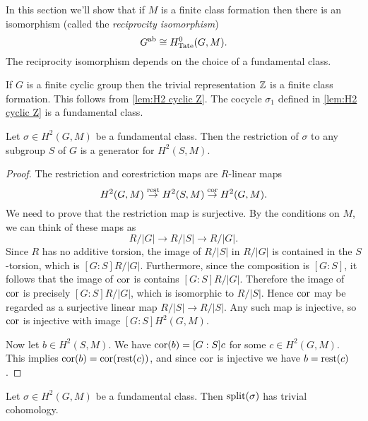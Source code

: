 In this section we'll show that if $M$ is a finite class formation then
there is an isomorphism (called the \emph{reciprocity isomorphism})
\[
	G^{\mathrm{ab}} \cong H^0_{\mathrm{Tate}}(G,M).
\]
The reciprocity isomorphism depends on the choice of a fundamental class.

\begin{example}
	If $G$ is a finite cyclic group then the trivial representation ${\mathbb Z}$
	is a finite class formation.
	This follows from \ref{lem:H2 cyclic Z}.
	The cocycle $\sigma_1$ defined in \ref{lem:H2 cyclic Z} is a fundamental class.
\end{example}

\begin{lemma} \label{lem:restriction fundamental class generates}
	Let $\sigma \in H^2(G,M)$ be a fundamental class.
	Then the restriction of $\sigma$ to any subgroup $S$ of $G$
	is a generator for $H^2(S,M)$.
\end{lemma}

\begin{proof}
	The restriction and corestriction maps are $R$-linear maps
	\[
		H^2(G,M) \stackrel{\mathrm{rest}}\to H^2(S,M) \stackrel{\mathrm{cor}}\to H^2(G,M).
	\]
	We need to prove that the restriction map is surjective.
	By the conditions on $M$, we can think of these maps as
	\[
		R / |G| \to R / |S| \to R / |G|.
	\]
	Since $R$ has no additive torsion, the image of $R/|S|$ in $R/|G|$
	is contained in the $S$-torsion, which is $[G:S] R / |G|$.
	Furthermore, since the composition is $[G:S]$,
	it follows that the image of $\mathrm{cor}$ is contains $[G:S] R / |G|$.
	Therefore the image of $\mathrm{cor}$ is precisely $[G:S] R / |G|$, which
	is isomorphic to $R/|S|$. Hence $\mathrm{cor}$ may be regarded as a surjective linear map
	$R/|S| \to R/|S|$. Any such map is injective, so $\mathrm{cor}$ is injective with image
	$[G:S] H^2(G,M)$.

	Now let $b \in H^2(S,M)$. We have $\mathrm{cor}(b) = [G:S]c$ for some $c \in H^2(G,M)$.
	This implies $\mathrm{cor}(b) = \mathrm{cor} (\mathrm{rest}( c))$, and since $\mathrm{cor}$ is injective we have
	$b = \mathrm{rest}(c)$.
\end{proof}

\begin{theorem} \label{thm:splitting module trivial}
	Let $\sigma \in H^2(G,M)$ be a fundamental class.
	Then $\mathrm{split}(\sigma)$ has trivial cohomology.
\end{theorem}

